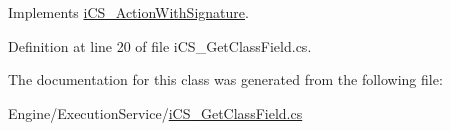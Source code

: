 Implements \hyperlink{classi_c_s___action_with_signature_ab62366545f5e9079753a1292a3a76354}{i\+C\+S\+\_\+\+Action\+With\+Signature}.



Definition at line 20 of file i\+C\+S\+\_\+\+Get\+Class\+Field.\+cs.



The documentation for this class was generated from the following file\+:\begin{DoxyCompactItemize}
\item 
Engine/\+Execution\+Service/\hyperlink{i_c_s___get_class_field_8cs}{i\+C\+S\+\_\+\+Get\+Class\+Field.\+cs}\end{DoxyCompactItemize}
